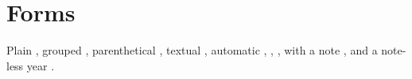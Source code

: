 \documentclass{article}
\begin{document}
\section{Forms}
Plain \cite{alpha}, grouped \cite{alpha,beta}, parenthetical \citep{beta},
textual \citet{gamma}, automatic \autocite{alpha}, \parencite{beta},
\textcite{gamma}, with a note \cite[p.~5]{alpha}, and a note-less year
\citeyear{alpha}.


\end{document}
